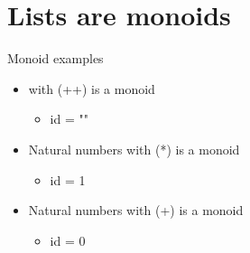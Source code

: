 \documentclass[presetation]{beamer}
\begin{document}
\section{Lists are monoids}
\label{sec:org32c4724}
\begin{frame}[label={sec:org173991c}]{Monoid examples}
\begin{example}
\begin{itemize}
\item\relax [] with (++) is a monoid
\begin{itemize}
\item id = ""
\end{itemize}
\item Natural numbers with (*) is a monoid
\begin{itemize}
\item id = 1
\end{itemize}
\item Natural numbers with (+) is a monoid
\begin{itemize}
\item id = 0
\end{itemize}
\end{itemize}
\end{example}
\end{frame}
\end{document}
